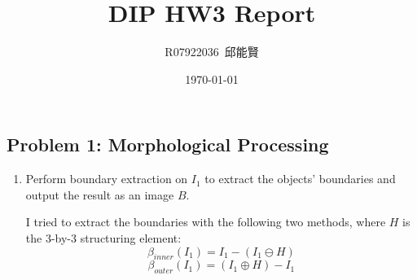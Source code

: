 \documentclass[12pt,a4paper,notitlepage,oneside,amsmath,amssymb]{article}
\begin{document}
\begin{CJK*}{UTF8}{bkai}

\CJKtilde{}
\CJKindent{}
\title{\vspace{-10ex}DIP HW3 Report}
\author{R07922036~邱能賢}
\date{\vspace{-1ex}\today}

\maketitle

\vspace{-5ex}

\section*{Problem 1: Morphological Processing}

\begin{enumerate}[label=(\alph*)]
	\item Perform boundary extraction on \(I_1\) to extract the objects’ boundaries and output the result as an image \(B\).

	      I tried to extract the boundaries with the following two methods, where \(H\) is the 3-by-3 structuring element:
	      \[\beta_{inner} (I_1)= I_1 - (I_1 \ominus H)\]
	      \[\beta_{outer} (I_1)= (I_1 \oplus H) - I_1\]


\end{enumerate}
\end{CJK*}
\end{document}
